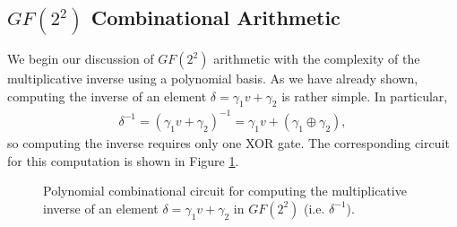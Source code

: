 \subsection{$GF(2^2)$ Combinational Arithmetic}
We begin our discussion of $GF(2^2)$ arithmetic with the complexity of the multiplicative inverse using a polynomial basis. As we have already shown, computing the inverse of an element $\delta = \gamma_1 v + \gamma_2$ is rather simple. In particular,
\begin{align*}
\delta^{-1} = (\gamma_1 v + \gamma_2)^{-1} = \gamma_1 v + (\gamma_1 \oplus \gamma_2),
\end{align*}
so computing the inverse requires only one XOR gate. The corresponding circuit for this computation is shown in Figure \ref{fig:gf22-pol-inverse}.

\begin{figure}[H] 
\centering
{}
\caption{Polynomial combinational circuit for computing the multiplicative inverse of an element $\delta = \gamma_1 v + \gamma_2$ in $GF(2^2)$ (i.e. $\delta^{-1}$).}
\label{fig:gf22-pol-inverse}
\end{figure}

